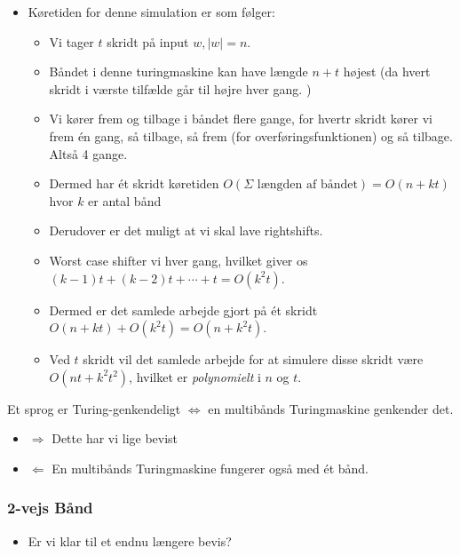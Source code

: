 \begin{frame}[allowframebreaks]
\begin{itemize}
\begin{enumerate}
          \end{enumerate}
    \item Køretiden for denne simulation er som følger:
          \begin{itemize}
            \item Vi tager $t$ skridt på input $w, |w| = n$.
            \item Båndet i denne turingmaskine kan have længde $n+t$ højest (da hvert skridt i værste tilfælde går til højre hver gang. )
            \item Vi kører frem og tilbage i båndet flere gange, for hvertr skridt kører vi frem én gang, så tilbage, så frem (for overføringsfunktionen) og så tilbage. Altså 4 gange.
            \item Dermed har ét skridt køretiden $O(\Sigma \text{ længden af båndet}) = O(n+kt)$ hvor $k$ er antal bånd
            \item Derudover er det muligt at vi skal lave rightshifts.
            \item Worst case shifter vi hver gang, hvilket giver os $(k-1)t + (k-2)t + \cdots + t = O(k^{2}t)$.
            \item Dermed er det samlede arbejde gjort på ét skridt $O(n+kt) + O(k^{2}t) = O(n+k^{2}t)$.
            \item Ved $t$ skridt vil det samlede arbejde for at simulere disse skridt være $O(nt + k^{2}t^{2})$, hvilket er \textit{polynomielt} i $n$ og $t$.
          \end{itemize}
  \end{itemize}

  \begin{corollary}
Et sprog er Turing-genkendeligt $\iff$ en multibånds Turingmaskine genkender det.
  \end{corollary}

  \begin{itemize}
    \item \(\Rightarrow\) Dette har vi lige bevist
    \item \(\Leftarrow\) En multibånds Turingmaskine fungerer også med ét bånd.
  \end{itemize}
\end{frame}

\begin{frame}[allowframebreaks]
  \frametitle{2-vejs Bånd}
  \begin{itemize}
    \item Er vi klar til et endnu længere bevis?
  \end{itemize}
\end{frame}

